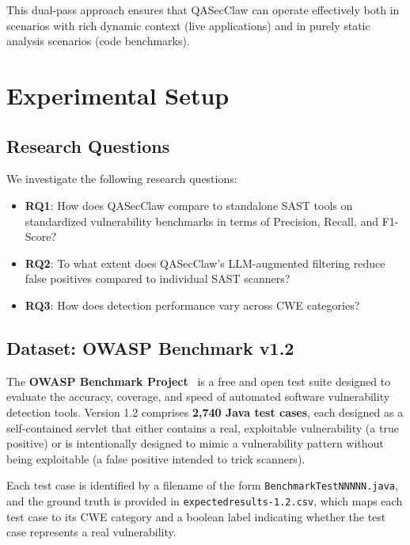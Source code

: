 \documentclass[conference]{IEEEtran}
\begin{document}
This dual-pass approach ensures that QASecClaw can operate effectively both in scenarios with rich dynamic context (live applications) and in purely static analysis scenarios (code benchmarks).

\section{Experimental Setup}
\label{sec:setup}

\subsection{Research Questions}
We investigate the following research questions:

\begin{itemize}
    \item \textbf{RQ1}: How does QASecClaw compare to standalone SAST tools on standardized vulnerability benchmarks in terms of Precision, Recall, and F1-Score?
    \item \textbf{RQ2}: To what extent does QASecClaw's LLM-augmented filtering reduce false positives compared to individual SAST scanners?
    \item \textbf{RQ3}: How does detection performance vary across CWE categories?
\end{itemize}

\subsection{Dataset: OWASP Benchmark v1.2}
The \textbf{OWASP Benchmark Project}~\cite{owasp2023benchmark} is a free and open test suite designed to evaluate the accuracy, coverage, and speed of automated software vulnerability detection tools. Version 1.2 comprises \textbf{2,740 Java test cases}, each designed as a self-contained servlet that either contains a real, exploitable vulnerability (a true positive) or is intentionally designed to mimic a vulnerability pattern without being exploitable (a false positive intended to trick scanners).

Each test case is identified by a filename of the form \texttt{BenchmarkTestNNNNN.java}, and the ground truth is provided in \texttt{expectedresults-1.2.csv}, which maps each test case to its CWE category and a boolean label indicating whether the test case represents a real vulnerability.
\end{document}
